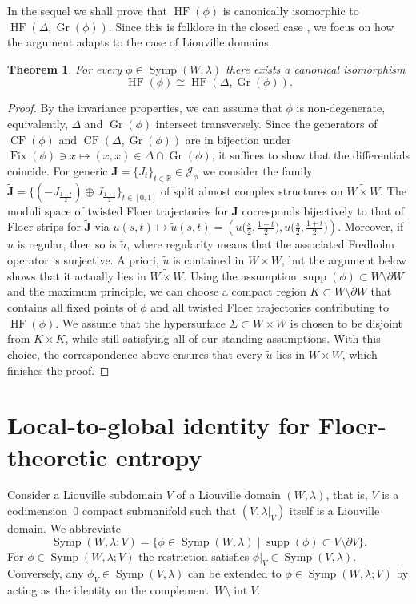 \documentclass[12pt]{article}
\theoremstyle{theorem}
\newtheorem{theorem}{Theorem}[section]
\theoremstyle{definition}
\theoremstyle{remark}
\numberwithin{equation}{section}
\newcommand{\p}{\partial}
\newcommand{\R}{{\mathbb{R}}}
\DeclareMathOperator{\supp}{supp}
\DeclareMathOperator{\Gr}{Gr}
\DeclareMathOperator{\Symp}{Symp}
\DeclareMathOperator{\Fix}{Fix}
\DeclareMathOperator{\HF}{HF}
\DeclareMathOperator{\CF}{CF}
\DeclareMathOperator{\Int}{int}
\begin{document}
In the sequel we shall prove that $\HF(\phi)$ is canonically isomorphic to $\HF(\Delta,\Gr(\phi))$.
Since this is folklore in the closed case \cite[Example~3.8]{Se14_2}, we focus on how the argument adapts to the case of Liouville domains.
\begin{theorem}\label{thm: can_isom}
For every $\phi\in\Symp(W,\lambda)$ there exists a canonical isomorphism
$$
\HF(\phi)\cong \HF(\Delta,\Gr(\phi)).
$$
\end{theorem}
\begin{proof}
By the invariance properties, we can assume that $\phi$ is non-degenerate, equivalently, $\Delta$ and $\Gr(\phi)$ intersect transversely.
Since the generators of $\CF(\phi)$ and $\CF(\Delta,\Gr(\phi))$ are in bijection under $\Fix(\phi)\ni x\mapsto (x,x)\in \Delta\cap\Gr(\phi)$, it suffices to show that the differentials coincide.
For generic ${\bm J}=\{J_t\}_{t\in \R}\in\mathcal{J}_{\phi}$ we consider the family $\widetilde{{\bm J}}=\big\{(-J_{\frac{1-t}{2}})\oplus J_{\frac{1+t}{2}}\big\}_{t\in[0,1]}$ of split almost complex structures on $\widetilde{W\times W}$.
The moduli space of twisted Floer trajectories for ${\bm J}$ corresponds bijectively to that of Floer strips for $\widetilde{{\bm J}}$ via
$
u(s,t) \mapsto\widetilde{u}(s,t)=\left(u\big(\frac{s}{2},\frac{1-t}{2}\big),u\big(\frac{s}{2},\frac{1+t}{2}\big)\right)
$.
Moreover, if $u$ is regular, then  so is $\widetilde{u}$, where regularity means that the associated Fredholm operator is surjective.
A priori, $\widetilde{u}$ is contained in $W\times W$, but the argument below shows that it actually lies in $\widetilde{W\times W}$.
Using the assumption $\supp(\phi)\subset W\setminus \p W$ and the maximum principle, we can choose a compact region $K\subset W\setminus\p W$ that contains all fixed points of $\phi$ and all twisted Floer trajectories contributing to $\HF(\phi)$.
We assume that the hypersurface $\Sigma\subset W\times W$ is chosen to be disjoint from $K\times K$, while still satisfying all of our standing assumptions.
With this choice, the correspondence above ensures that every $\widetilde{u}$ lies in $\widetilde{W\times W}$, which finishes the proof.
\end{proof}




\section{Local-to-global identity for Floer-theoretic entropy}\label{sec: LtoG}
Consider a Liouville subdomain $V$ of a Liouville domain $(W,\lambda)$, that is, 
$V$ is a codimension~0 compact submanifold such that $(V,\lambda|_V)$ itself is a Liouville domain.
We abbreviate
$$
\Symp(W,\lambda;V)=\{\phi\in\Symp(W,\lambda)\mid \supp(\phi) \subset V\setminus \p V\}.
$$
For $\phi\in \Symp(W,\lambda;V)$ the restriction satisfies $\phi|_V\in \Symp(V,\lambda)$.
Conversely, any $\phi_V\in \Symp(V,\lambda)$ can be extended to $\phi\in \Symp(W,\lambda;V)$ by acting as the identity on the complement~$W\setminus \Int V$.
\end{document}
